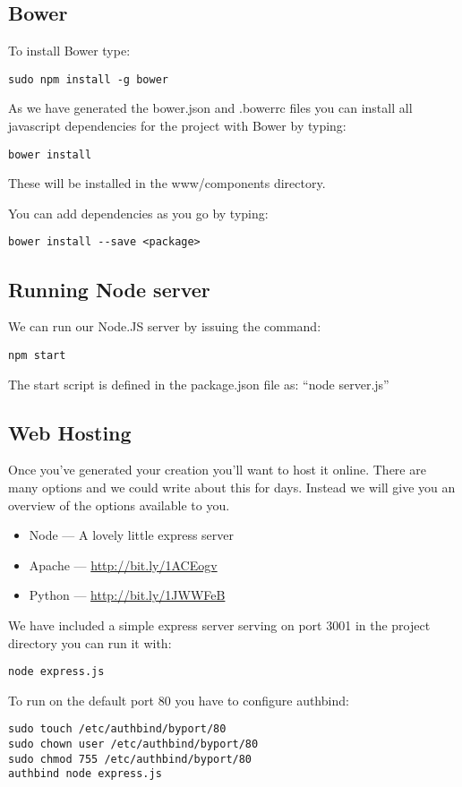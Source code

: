 \documentclass[twocolumn]{article}
\begin{document}
\subsection{Bower}
To install Bower type:

\begin{lstlisting}
sudo npm install -g bower
\end{lstlisting}

As we have generated the bower.json and .bowerrc files you can install all javascript dependencies for the project with Bower by typing:
\begin{lstlisting}
bower install
\end{lstlisting}
These will be installed in the www/components directory.

You can add dependencies as you go by typing:
\begin{lstlisting}
bower install --save <package>
\end{lstlisting}

\subsection{Running Node server}
We can run our Node.JS server by issuing the command:
\begin{lstlisting}
npm start
\end{lstlisting}
The start script is defined in the package.json file as: ``node server.js''

\subsection{Web Hosting}

Once you've generated your creation you'll want to host it online. There are many options and we could write about this for days. Instead we will give you an overview of the options available to you.

\begin{itemize}
\item Node --- A lovely little express server
\item Apache --- \url{http://bit.ly/1ACEogv}
\item Python --- \url{http://bit.ly/1JWWFeB}

\end{itemize}

We have included a simple express server serving on port 3001 in the project directory you can run it with:
\begin{lstlisting}
node express.js
\end{lstlisting}

To run on the default port 80 you have to configure authbind:
\begin{lstlisting}
sudo touch /etc/authbind/byport/80
sudo chown user /etc/authbind/byport/80
sudo chmod 755 /etc/authbind/byport/80
authbind node express.js
\end{lstlisting}
\end{document}
